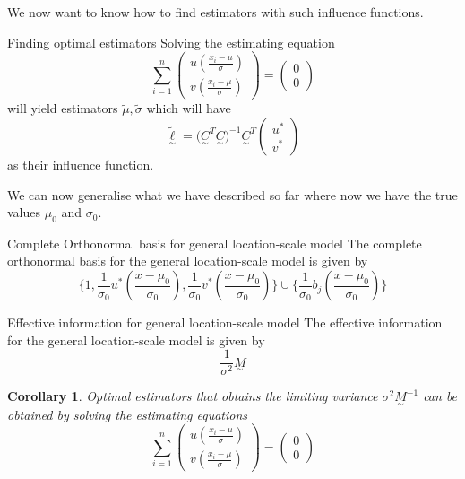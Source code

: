 \documentclass[twoside]{article}
\newtheorem{corollary}[theorem]{Corollary}
\newcommand{\utilde}{\underset{\sim}}
\begin{document}
We now want to know how to find estimators with such influence functions.

\begin{proposition_exam}{Finding optimal estimators}{} Solving the estimating equation 
$$
\sum_{i=1}^{n}
\begin{pmatrix}
u(\frac{x_i - \mu}{\sigma})\\
v(\frac{x_i - \mu}{\sigma})
\end{pmatrix} = 
\begin{pmatrix}
0\\0
\end{pmatrix}
$$
will yield estimators $\tilde{\mu}, \tilde{\sigma}$ which will have 
$$
\utilde{\tilde{\ell}}
 = \big(\utilde{C}^T \utilde{C} \big)^{-1}\utilde{C}^T\begin{pmatrix}
u^*\\ v^*
\end{pmatrix}
$$
as their influence function.
\end{proposition_exam}


We can now generalise what we have described so far where now we have the true values $\mu_0$ and $\sigma_0$.

\begin{proposition_exam}{Complete Orthonormal basis for general location-scale model}{} The complete orthonormal basis for the general location-scale model is given by 
\begin{equation}
\bigg\{1, \frac{1}{\sigma_0}u^{*}(\frac{x - \mu_0}{\sigma_0}), \frac{1}{\sigma_0}v^{*}(\frac{x - \mu_0}{\sigma_0})\bigg\} \cup \bigg\{\frac{1}{\sigma_0}b_j(\frac{x - \mu_0}{\sigma_0})\bigg\}
\end{equation}
\end{proposition_exam}

\begin{proposition_exam}{Effective information for general location-scale model}{}  The effective information for the general location-scale model is given by 
\begin{equation}
\frac{1}{\sigma^2}\utilde{M}
\end{equation}
\end{proposition_exam}

\begin{corollary}
Optimal estimators that obtains the limiting variance $\sigma^2\utilde{M}^{-1}$ can be obtained by solving the estimating equations 
\begin{equation}
\sum_{i=1}^{n}
\begin{pmatrix}
u(\frac{x_i - \mu}{\sigma})\\
v(\frac{x_i - \mu}{\sigma})
\end{pmatrix} = 
\begin{pmatrix}
0\\0
\end{pmatrix}
\end{equation}
\end{corollary}
\end{document}
